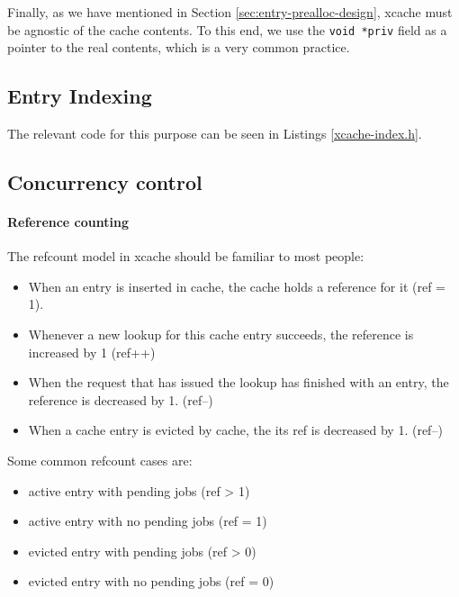 Finally, as we have mentioned in Section \ref{sec:entry-prealloc-design}, xcache 
must be agnostic of the cache contents.  To this end, we use the \texttt{void 
	*priv} field as a pointer to the real contents, which is a very common 
practice.

\subsection{Entry Indexing}

The relevant code for this purpose can be seen in Listings \ref{xcache-index.h}.



\subsection{Concurrency control}

\paragraph{Reference counting}\label{par:refcount-imp}

The refcount model in xcache should be familiar to most people:

\begin{itemize}
	\item When an entry is inserted in cache, the cache holds a reference 
		for it (ref = 1).
	\item Whenever a new lookup for this cache entry succeeds, the reference 
		is increased by 1 (ref++)
	\item When the request that has issued the lookup has finished with an 
		entry, the reference is decreased by 1. (ref--)
	\item When a cache entry is evicted by cache, the its ref is decreased 
		by 1. (ref--)
\end{itemize}

Some common refcount cases are:

\begin{itemize}
	\item active entry with pending jobs (ref > 1)
	\item active entry with no pending jobs (ref = 1)
	\item evicted entry with pending jobs (ref > 0)
	\item evicted entry with no pending jobs (ref = 0)
\end{itemize}

